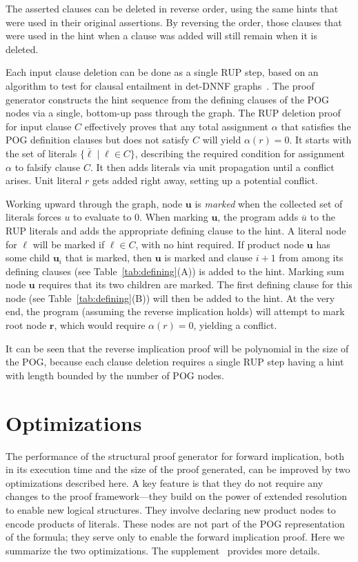 \documentclass[letterpaper,USenglish,cleveref, autoref, thm-restate]{lipics-v2021}
\newcommand{\obar}[1]{\overline{#1}}
\newcommand{\lit}{\ell}
\newcommand{\assign}{\alpha}
\newcommand{\makenode}[1]{\mathbf{#1}}
\newcommand{\nodeu}{\makenode{u}}
\newcommand{\noder}{\makenode{r}}
\begin{document}
The asserted clauses can be deleted in reverse order, using the same
hints that were used in their original assertions.  By reversing the
order, those clauses that were used in the hint when a clause was
added will still remain when it is deleted.

Each input clause deletion can be done as a single RUP step, based
on an algorithm to test for clausal entailment in det-DNNF graphs~\cite{capelli:sat:2019,darwiche:jair:2002}.  The
proof generator constructs the hint sequence from the defining
clauses of the POG nodes via a single, bottom-up pass through the
graph.  The RUP deletion proof for input clause $C$ effectively proves that any
total assignment $\assign$ that satisfies the POG definition clauses
but does not satisfy $C$ will yield
$\assign(r) = 0$.  It starts with the set of literals
$\{ \obar{\lit} \mid \lit \in C\}$, describing the required condition for
assignment $\assign$ to falsify clause $C$.
It then
adds literals via unit propagation until a
conflict arises.    Unit literal $r$ gets
added right away, setting up a potential conflict.

Working upward through the graph, node $\nodeu$ is \emph{marked} when
the collected set of literals forces $u$ to evaluate to $0$.  When marking $\nodeu$, the
program adds $\obar{u}$ to the RUP literals and adds the appropriate
defining clause to the hint.  A literal node for
$\lit$ will be marked if $\lit \in C$, with no hint required.  If
product node $\nodeu$ has some child $\nodeu_i$ that is marked, then
$\nodeu$ is marked and clause $i+1$ from among its defining clauses (see Table~\ref{tab:defining}(A)) is
added to the hint.  Marking sum node $\nodeu$ requires that its two children are marked.
The first defining
clause for this node (see Table~\ref{tab:defining}(B)) will then be added to the hint.  At the very end, the program
(assuming the reverse implication holds) will attempt to mark root
node $\noder$, which would require $\assign(r) = 0$, yielding a
conflict.

It can be seen that the reverse implication proof will be polynomial in the size of the POG\@, because
each clause deletion requires a single RUP step having a hint with length
bounded by the number of POG nodes.

\section{Optimizations}

The performance of the structural proof generator for forward implication, both in its execution time and
the size of the proof generated, can be improved by two optimizations
described here.  A key feature is that they do not require any changes
to the proof framework---they build on the power of extended
resolution to enable new logical structures.  They
involve declaring new product nodes to encode products of literals.
These nodes are not part of the POG
representation of the formula; they serve only to enable the forward
implication proof.  Here we summarize the two optimizations.
The supplement~\cite{bryant:sat:2023:supplement} provides more details.
\end{document}
